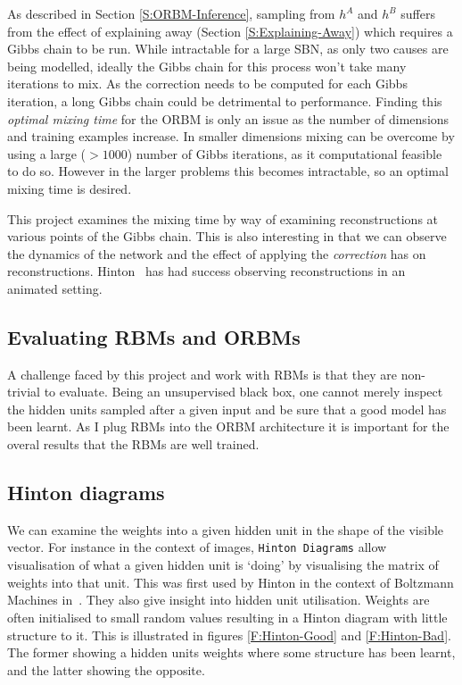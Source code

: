 As described in Section \ref{S:ORBM-Inference}, sampling from $h^A$ and $h^B$ suffers from the effect of explaining away (Section \ref{S:Explaining-Away}) which requires a Gibbs chain to be run. While intractable for a large SBN, as only two causes are being modelled, ideally the Gibbs chain for this process won't take many iterations to mix. As the correction needs to be computed for each Gibbs iteration, a long Gibbs chain could be detrimental to performance.
Finding this \emph{optimal mixing time} for the ORBM is only an issue as the number of dimensions and training examples increase. In smaller dimensions mixing can be overcome by using a large ($>1000$) number of Gibbs iterations, as it computational feasible to do so. However in the larger problems this becomes intractable, so an optimal mixing time is desired.

This project examines the mixing time by way of examining reconstructions at various points of the Gibbs chain. This is also interesting in that we can observe the dynamics of the network and the effect of applying the \emph{correction} has on reconstructions. Hinton~\cite{Hinton-Animations} has had success observing reconstructions in an animated setting.

\subsection{Evaluating RBMs and ORBMs}

  A challenge faced by this project and work with RBMs is that they are non-trivial to evaluate. Being an unsupervised black box, one cannot merely inspect the hidden units sampled after a given input and be sure that a good model has been learnt. As I plug RBMs into the ORBM architecture it is important for the overal results that the RBMs are well trained.

\subsection{Hinton diagrams}
  We can examine the weights into a given hidden unit in the shape of the visible vector. For instance in the context of images, \texttt{Hinton Diagrams} allow visualisation of what a given hidden unit is `doing' by visualising the matrix of weights into that unit. This was first used by Hinton in the context of Boltzmann Machines in~\cite{Hinton:1986:LRB:104279.104291}. They also give insight into hidden unit utilisation. Weights are often initialised to small random values resulting in a Hinton diagram with little structure to it. This is illustrated in figures \ref{F:Hinton-Good} and \ref{F:Hinton-Bad}. The former showing a hidden units weights where some structure has been learnt, and the latter showing the opposite.


